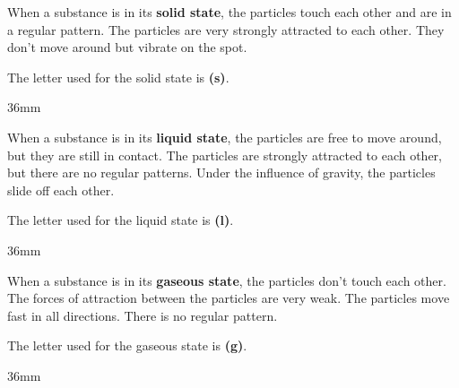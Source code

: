 \begin{minipage}[t]{0.60\linewidth}
  \vspace{0pt}
    When a substance is in its \textbf{solid state}, the particles touch each other and are in a regular pattern. The particles are very strongly attracted to each other. They don't move around but vibrate on the spot.

    The letter used for the solid state is \textbf{(s)}.
\end{minipage}\hfill
\begin{minipage}[t]{0.35\linewidth}
  \vspace{0pt}
  \begin{DrawingBox}{\linewidth}{36mm}
  \end{DrawingBox}
\end{minipage}


\begin{minipage}[t]{0.60\linewidth}
  \vspace{0pt}
    When a substance is in its \textbf{liquid state}, the particles are free to move around, but they are still in contact. The particles are strongly attracted to each other, but there are no regular patterns. Under the influence of gravity, the particles slide off each other.
    
    The letter used for the liquid state is \textbf{(l)}.
\end{minipage}\hfill
\begin{minipage}[t]{0.35\linewidth}
  \vspace{0pt}
  \begin{DrawingBox}{\linewidth}{36mm}
  \end{DrawingBox}
\end{minipage}


\begin{minipage}[t]{0.60\linewidth}
  \vspace{0pt}
    When a substance is in its \textbf{gaseous state}, the particles don't touch each other. The forces of attraction between the particles are very weak. The particles move fast in all directions. There is no regular pattern.

    The letter used for the gaseous state is \textbf{(g)}.
\end{minipage}\hfill
\begin{minipage}[t]{0.35\linewidth}
  \vspace{0pt}
  \begin{DrawingBox}{\linewidth}{36mm}
  \end{DrawingBox}
\end{minipage}



